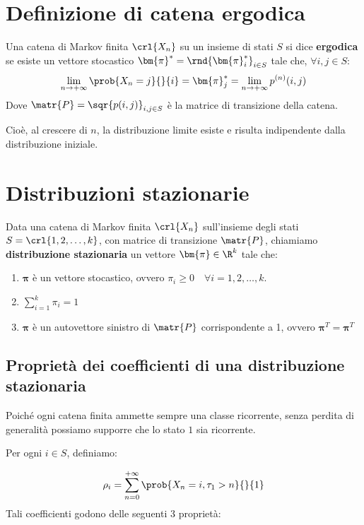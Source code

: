 \documentclass[\main/main.tex]{subfiles}
\begin{document}
\section{Definizione di catena ergodica}
\begin{definition}
	Una catena di Markov finita \(\crl{X_n}\) su un insieme di stati \(S\) si dice \textbf{ergodica} se esiste un vettore stocastico \(\bm{\pi}^* = \rnd{\bm{\pi}_i^*}_{i \in S}\) tale che, \(\forall i,j \in S\):
	\[
		\lim_{n\rightarrow+\infty} \prob{X_n = j}{}{i} = \bm{\pi}_j^* = \lim_{n \rightarrow + \infty} p^{(n)} (i,j)
	\]
	Dove \(\matr{P} = \sqr{p(i,j)}_{i,j \in S}\) è la matrice di transizione della catena.

	Cioè, al crescere di \(n\), la distribuzione limite esiste e risulta indipendente dalla distribuzione iniziale.
\end{definition}

\section{Distribuzioni stazionarie}
\begin{definition}
	Data una catena di Markov finita \(\crl{X_n}\) sull'insieme degli stati \(S = \crl{1,2, \ldots, k}\), con matrice di transizione \(\matr{P}\), chiamiamo \textbf{distribuzione stazionaria} un vettore \(\bm{\pi} \in \R^k\) tale che:
	\begin{enumerate}
		\item \(\bm{\pi}\) è un vettore stocastico, ovvero \(\pi_i \geq 0 \quad \forall i = 1,2,\ldots, k\).
		\item \(\sum_{i=1}^k \pi_i = 1\)
		\item \(\bm{\pi}\) è un autovettore sinistro di \(\matr{P}\) corrispondente a 1, ovvero \(\bm{\pi}^T = \bm{\pi}^T\)
	\end{enumerate}
\end{definition}

\subsection{Proprietà dei coefficienti di una distribuzione stazionaria}
Poiché ogni catena finita ammette sempre una classe ricorrente, senza perdita di generalità possiamo supporre che lo stato \(1\) sia ricorrente.

Per ogni \(i \in S\), definiamo:

\[
	\rho_i = \sum_{n=0}^{+\infty} \prob{X_n = i, \tau_1 > n}{}{1}
\]
Tali coefficienti godono delle seguenti 3 proprietà:
\end{document}
